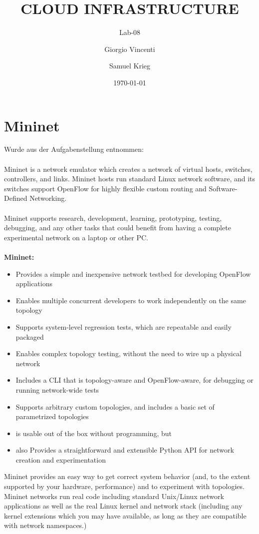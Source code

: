 \documentclass[a4,12pt]{scrartcl}
\title{CLOUD INFRASTRUCTURE}
\subtitle{Lab-08}
\author{Giorgio Vincenti \and Samuel Krieg}
\date{\today}
\begin{document}
\clearpage\maketitle
\thispagestyle{empty}
\tableofcontents
\newpage


\section{Mininet}
Wurde aus der Aufgabenstellung entnommen: \\
\\
Mininet is a network emulator which creates a network of virtual hosts, switches, controllers, and links. Mininet hosts run standard Linux network software, and its switches support OpenFlow for highly flexible custom routing and Software-Defined Networking.\\
\\
Mininet supports research, development, learning, prototyping, testing, debugging, and any other tasks that could benefit from having a complete experimental network on a laptop or other PC.\\
\\
\textbf{Mininet:}
\begin{itemize}
\item Provides a simple and inexpensive network testbed for developing OpenFlow applications
\item Enables multiple concurrent developers to work independently on the same topology
\item Supports system-level regression tests, which are repeatable and easily packaged
\item Enables complex topology testing, without the need to wire up a physical network
\item Includes a CLI that is topology-aware and OpenFlow-aware, for debugging or running network-wide tests
\item Supports arbitrary custom topologies, and includes a basic set of parametrized topologies
\item is usable out of the box without programming, but
\item also Provides a straightforward and extensible Python API for network creation and experimentation
\end{itemize}

\noindent Mininet provides an easy way to get correct system behavior (and, to the extent supported by your hardware, performance) and to experiment with topologies.
Mininet networks run real code including standard Unix/Linux network applications as well as the real Linux kernel and network stack (including any kernel extensions which you may have available, as long as they are compatible with network namespaces.)
\end{document}
